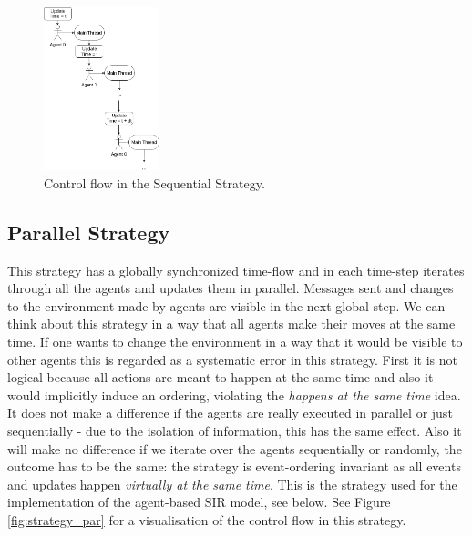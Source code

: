 \begin{figure}[H]
	\centering
	\includegraphics[width=0.3\textwidth, angle=0]{./fig/implabs/sequential.png}
	\caption{Control flow in the Sequential Strategy.}
	\label{fig:strategy_seq}
\end{figure}

\subsection{Parallel Strategy}
\label{sub:par_strategy}

This strategy has a globally synchronized time-flow and in each time-step iterates through all the agents and updates them in parallel. Messages sent and changes to the environment made by agents are visible in the next global step. We can think about this strategy in a way that all agents make their moves at the same time.  If one wants to change the environment in a way that it would be visible to other agents this is regarded as a systematic error in this strategy. First it is not logical because all actions are meant to happen at the same time and also it would implicitly induce an ordering, violating the \textit{happens at the same time} idea. 
It does not make a difference if the agents are really executed in parallel or just sequentially - due to the isolation of information, this has the same effect. Also it will make no difference if we iterate over the agents sequentially or randomly, the outcome has to be the same: the strategy is event-ordering invariant as all events and updates happen \textit{virtually at the same time}. This is the strategy used for the implementation of the agent-based SIR model, see below. See Figure \ref{fig:strategy_par} for a visualisation of the control flow in this strategy.


